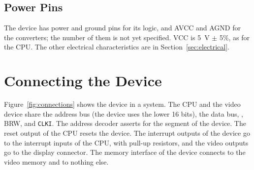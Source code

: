 \subsection{Power Pins}

The device has power and ground pins for its logic, and AVCC and AGND for the converters; the number of them is not yet
specified. VCC is 5~V $\pm$ 5\%, as for the CPU. The other electrical characteristics are in
Section~\ref{sec:electrical}.

\section{Connecting the Device}

Figure~\ref{fig:connections} shows the device in a system. The CPU and the video device share the address bus (the
device uses the lower 16 bits), the data bus, , BRW,  and \texttt{CLKI}. The address
decoder asserts  for the segment of the device. The reset output of the CPU resets the device. The
interrupt outputs of the device go to the interrupt inputs of the CPU, with pull-up resistors, and the video outputs go
to the display connector. The memory interface of the device connects to the video memory and to nothing else.

